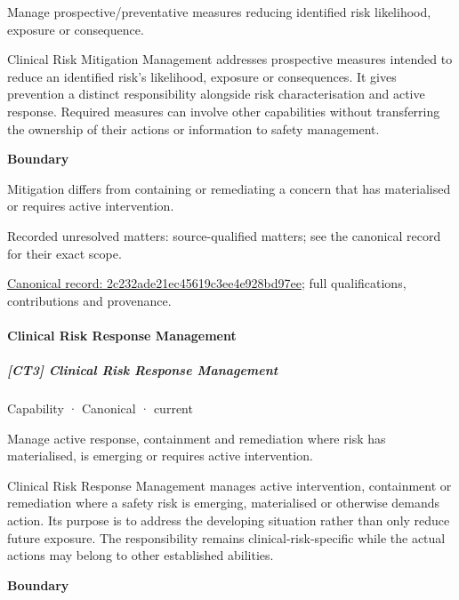 Manage prospective/preventative measures reducing identified risk likelihood, exposure or consequence.



Clinical Risk Mitigation Management addresses prospective measures intended to reduce an identified risk's likelihood, exposure or consequences. It gives prevention a distinct responsibility alongside risk characterisation and active response. Required measures can involve other capabilities without transferring the ownership of their actions or information to safety management.



\textbf{Boundary}



Mitigation differs from containing or remediating a concern that has materialised or requires active intervention.


{\small Recorded unresolved matters: source-qualified matters; see the canonical record for their exact scope.}\par
{\footnotesize \href{../../../../continuum/strategy/capability/2c232ade21ec45619c3ee4e928bd97ee.md}{Canonical record: 2c232ade21ec45619c3ee4e928bd97ee}; full qualifications, contributions and provenance.}\par
\paragraph{Clinical Risk Response Management}

\subparagraph{[CT3] Clinical Risk Response Management}

\label{element:5e36cb137e4e4782b2ddbf78cdf0da7b}
{\small Capability · Canonical · current}\par

Manage active response, containment and remediation where risk has materialised, is emerging or requires active intervention.



Clinical Risk Response Management manages active intervention, containment or remediation where a safety risk is emerging, materialised or otherwise demands action. Its purpose is to address the developing situation rather than only reduce future exposure. The responsibility remains clinical-risk-specific while the actual actions may belong to other established abilities.



\textbf{Boundary}



